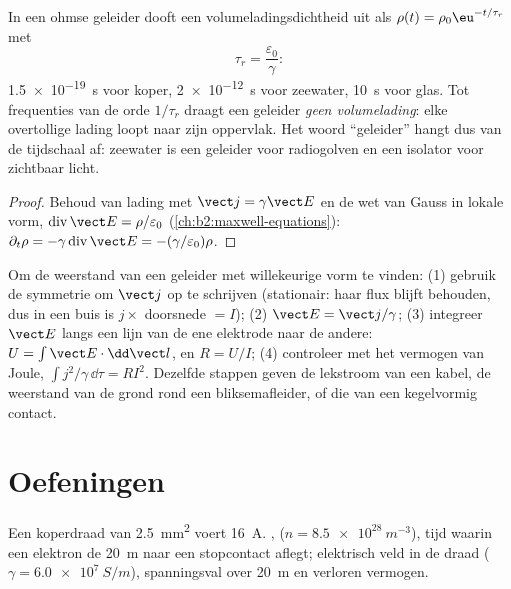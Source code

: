 \begin{proposition}\label{prop:b2:charges-currents-conduction:relaxation}
In een ohmse geleider dooft een volumeladingsdichtheid uit als
$\rho(t) =
\rho_0\eu^{-t/\tau_r}$ met
\[
\tau_r = \frac{\varepsilon_0}{\gamma} :
\]
\qty{1.5e-19}{s} voor koper, \qty{2e-12}{s} voor zeewater, \qty{10}{s} voor
glas. Tot frequenties van de orde $1/\tau_r$ draagt een geleider \emph{geen
volumelading}: elke overtollige lading loopt naar zijn oppervlak. Het woord
``geleider'' hangt dus van de tijdschaal af: zeewater is een geleider voor
radiogolven en een isolator voor zichtbaar licht.
\end{proposition}

\begin{proof}
Behoud van lading met $\vect j = \gamma\vect E$ en de wet van Gauss in
lokale vorm, $\operatorname{div}\vect E = \rho/\varepsilon_0$
(\cref{ch:b2:maxwell-equations}):
$\partial_t\rho = -\gamma\operatorname{div}\vect E = -(\gamma/\varepsilon_0)\rho$.
\end{proof}

\begin{method}\label{met:b2:charges-currents-conduction:method}
Om de weerstand van een geleider met willekeurige vorm te vinden: (1)
gebruik de symmetrie om $\vect j$ op te schrijven (stationair: haar flux
blijft behouden, dus in een buis is $j \times$ doorsnede $= I$); (2)
$\vect E = \vect j/\gamma$; (3) integreer $\vect E$ langs een lijn van de
ene elektrode naar de andere: $U = \int\vect E\cdot
\dd\vect l$, en
$R = U/I$; (4) controleer met het vermogen van Joule,
$\int j^2/\gamma\,
\dd\tau = RI^2$. Dezelfde stappen geven de lekstroom van
een kabel, de weerstand van de grond rond een bliksemafleider, of die van
een kegelvormig contact.
\end{method}

\section{Oefeningen}

\begin{exercise}[$\star$]\label{exo:b2:charges-currents-conduction:1}
Een koperdraad van \qty{2.5}{mm^2} voert \qty{16}{A}. ,
 ($n = \qty{8.5e28}{m^{-3}}$), tijd waarin een elektron de
\qty{20}{m} naar een stopcontact aflegt; elektrisch veld in de draad
($\gamma = \qty{6.0e7}{S/m}$), spanningsval over \qty{20}{m} en verloren
vermogen.
\end{exercise}

